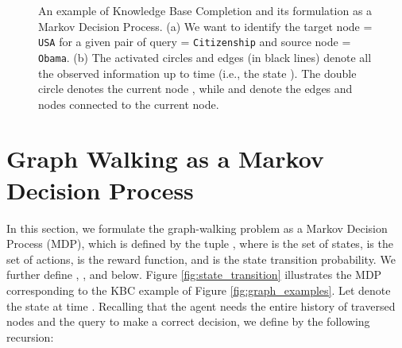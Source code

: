 \documentclass{article}
\begin{document}
    
    \begin{figure}[t!]
    \centerline{
    }\caption{{\small An example of Knowledge Base Completion and its formulation as a Markov Decision Process. (a) We want to identify the target node  = \texttt{USA} for a given pair of query  = \texttt{Citizenship} and source node  = \texttt{Obama}. (b) The activated circles and edges (in black lines) denote all the observed information up to time  (i.e., the state ). The double circle denotes the current node , while  and  denote the edges and nodes connected to the current node.}}
    \end{figure}
	
	
\section{Graph Walking as a Markov Decision Process}
\label{Sec:MDPformulation}
	
	In this section, we formulate the graph-walking problem as a Markov Decision Process (MDP), which is defined by the tuple , where  is the set of states,  is the set of actions,  is the reward function, and  is the state transition probability. We further define , ,  and  below. Figure \ref{fig:state_transition} illustrates the MDP corresponding to the KBC example of Figure \ref{fig:graph_examples}. Let  denote the state at time . Recalling that the agent needs the entire history of traversed nodes and the query to make a correct decision, we define  by the following recursion:
\end{document}
